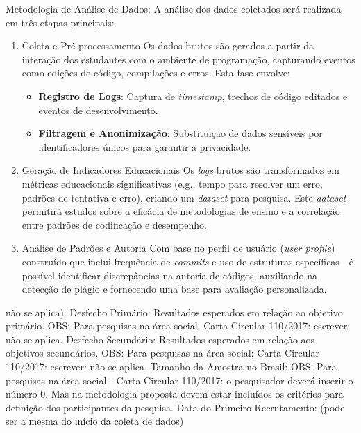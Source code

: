 \documentclass[10pt,a4paper]{article}
\begin{document}
\begin{enumerate}
Metodologia de Análise de Dados: %
A análise dos dados coletados será realizada em três etapas principais:
\begin{enumerate}
\item Coleta e Pré-processamento
Os dados brutos são gerados a partir da interação dos estudantes com o ambiente de programação, capturando eventos como edições de código, compilações e erros. Esta fase envolve:
		\begin{itemize}
   		\item \textbf{Registro de Logs}: Captura de \textit{timestamp}, trechos de código editados e 						eventos de desenvolvimento.
  		\item \textbf{Filtragem e Anonimização}: Substituição de dados sensíveis por identificadores únicos 				para garantir a privacidade.
	\end{itemize}
\item Geração de Indicadores Educacionais
	Os \textit{logs} brutos são transformados em métricas educacionais significativas (e.g., tempo para 			resolver um erro, padrões de tentativa-e-erro), criando um \textit{dataset} para pesquisa. Este 				\textit{dataset} permitirá estudos sobre a eficácia de metodologias de ensino e a correlação entre 				padrões de codificação e desempenho.
\item Análise de Padrões e Autoria
	Com base no perfil de usuário (\textit{user profile}) construído que inclui frequência de 						\textit{commits} e uso de estruturas específicas—é possível identificar discrepâncias na autoria de 			códigos, auxiliando na detecção de plágio e fornecendo uma base para avaliação personalizada.
\end{enumerate}
não se aplica).
Desfecho Primário: Resultados esperados em relação ao objetivo primário.
OBS: Para pesquisas na área social: Carta Circular 110/2017: escrever: não se aplica.
Desfecho Secundário: Resultados esperados em relação aos objetivos secundários.
OBS: Para pesquisas na área social: Carta Circular 110/2017: escrever: não se aplica.
Tamanho da Amostra no Brasil:
OBS: Para pesquisas na área social - Carta Circular 110/2017: o pesquisador deverá inserir o número 0. Mas na metodologia
proposta devem estar incluídos os critérios para definição dos participantes da pesquisa.
Data do Primeiro Recrutamento: (pode ser a mesma do início da coleta de dados)

\end{enumerate}
\end{document}
